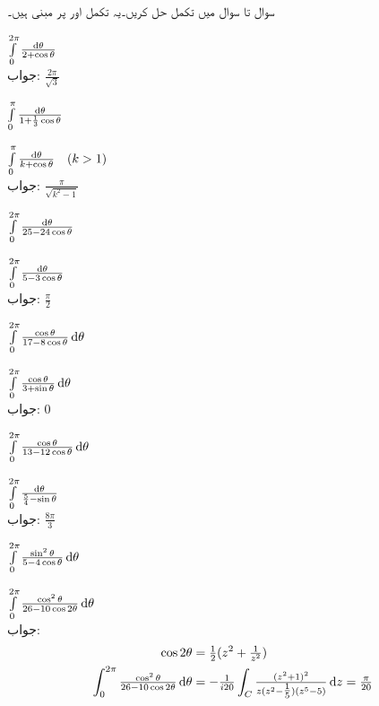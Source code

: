 سوال  تا سوال  میں تکمل حل کریں۔یہ تکمل  اور  پر مبنی ہیں۔ 

\quad
$\int\limits_{0}^{2\pi} \frac{\dif \theta}{2+\cos\theta}$\\
جواب:\quad
$\tfrac{2\pi}{\sqrt{3}}$

\quad
$\int\limits_{0}^{\pi} \frac{\dif \theta}{1+\frac{1}{3}\cos\theta}$

\quad
$\int\limits_{0}^{\pi} \frac{\dif \theta}{k+\cos\theta}\quad (k>1)$\\
جواب:\quad
$\tfrac{\pi}{\sqrt{k^2-1}}$

\quad
$\int\limits_{0}^{2\pi} \frac{\dif \theta}{25-24\cos\theta}$

\quad
$\int\limits_{0}^{2\pi} \frac{\dif \theta}{5-3\cos\theta}$\\
جواب:\quad
$\tfrac{\pi}{2}$

\quad
$\int\limits_{0}^{2\pi} \frac{\cos\theta}{17-8\cos\theta}\dif \theta$

\quad
$\int\limits_{0}^{2\pi} \frac{\cos \theta}{3+\sin\theta}\dif \theta$\\
جواب:\quad
$0$

\quad
$\int\limits_{0}^{2\pi} \frac{\cos\theta}{13-12\cos\theta}\dif \theta$

\quad
$\int\limits_{0}^{2\pi} \frac{\dif \theta}{\frac{5}{4}-\sin\theta}$\\
جواب:\quad
$\tfrac{8\pi}{3}$

\quad
$\int\limits_{0}^{2\pi} \frac{\sin^2\theta}{5-4\cos\theta}\dif \theta$

\quad
$\int\limits_{0}^{2\pi} \frac{\cos^2\theta}{26-10\cos2\theta}\dif \theta$\\
جواب:\quad
\begin{align*}
\cos 2\theta&=\tfrac{1}{2}(z^2+\tfrac{1}{z^2})\\
 \int_0^{2\pi} \tfrac{\cos^2\theta}{26-10\cos2\theta}\dif\theta&=-\tfrac{1}{i20}\int_C \tfrac{(z^2+1)^2}{z(z^2-\tfrac{1}{5})(z^5-5)}\dif z=\tfrac{\pi}{20}
\end{align*}

